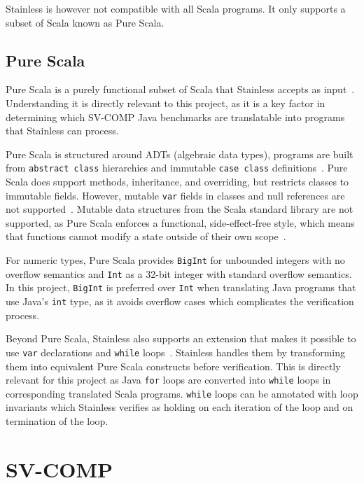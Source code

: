 \documentclass[11pt,titlepage,openright]{book}
\begin{document}
Stainless is however not compatible with all Scala programs.
It only supports a subset of Scala known as Pure Scala.

\subsection{Pure Scala}
\label{sec:pure_scala}


Pure Scala is a purely functional subset of Scala that 
Stainless accepts as input~\cite{StainlessPureScala}. 
Understanding it is directly relevant to this project, 
as it is a key factor in determining which SV-COMP 
Java benchmarks are translatable into programs that Stainless 
can process.

Pure Scala is structured around ADTs (algebraic data types),
programs are built from \texttt{abstract class} hierarchies 
and immutable \texttt{case class} definitions~\cite{StainlessPureScala}. 
Pure Scala does support methods, inheritance, and overriding, 
but restricts classes to immutable fields. However, 
mutable \texttt{var} fields in classes and null references 
are not supported~\cite{KuncakStainlessTutorial}. 
Mutable data structures from the Scala standard library are not supported,
as Pure Scala enforces a functional, side-effect-free
style, which means that functions cannot modify a state 
outside of their own scope~\cite{StainlessPureScala}.

For numeric types, Pure Scala provides \texttt{BigInt} for unbounded
integers with no overflow semantics and \texttt{Int} as a 32-bit
integer with standard overflow semantics. In this project, 
\texttt{BigInt} is preferred over \texttt{Int} when 
translating Java programs that use Java's \texttt{int} type, 
as it avoids overflow cases which complicates the verification process.

Beyond Pure Scala, Stainless also supports an extension
that makes it possible to use \texttt{var} declarations
and \texttt{while} loops~\cite{StainlessImperative}.
Stainless handles them by transforming them into equivalent 
Pure Scala constructs before verification. This is directly relevant
for this project as Java \texttt{for} loops are converted into 
\texttt{while} loops in corresponding translated Scala programs.
\texttt{while} loops can be annotated with loop invariants
which Stainless verifies as holding on each iteration of the loop and
on termination of the loop.  

\section{SV-COMP}
\label{sec:svcomp}
\end{document}

